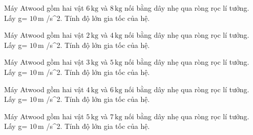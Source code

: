 \begin{bt}
Máy Atwood gồm hai vật $6\,\text{kg}$ và $8\,\text{kg}$ nối bằng dây nhẹ qua ròng rọc lí tưởng. Lấy g= $10\,\text{m}$ /s^2. Tính độ lớn gia tốc của hệ.
\end{bt}

\begin{bt}
Máy Atwood gồm hai vật $2\,\text{kg}$ và $4\,\text{kg}$ nối bằng dây nhẹ qua ròng rọc lí tưởng. Lấy g= $10\,\text{m}$ /s^2. Tính độ lớn gia tốc của hệ.
\end{bt}

\begin{bt}
Máy Atwood gồm hai vật $3\,\text{kg}$ và $5\,\text{kg}$ nối bằng dây nhẹ qua ròng rọc lí tưởng. Lấy g= $10\,\text{m}$ /s^2. Tính độ lớn gia tốc của hệ.
\end{bt}

\begin{bt}
Máy Atwood gồm hai vật $4\,\text{kg}$ và $6\,\text{kg}$ nối bằng dây nhẹ qua ròng rọc lí tưởng. Lấy g= $10\,\text{m}$ /s^2. Tính độ lớn gia tốc của hệ.
\end{bt}

\begin{bt}
Máy Atwood gồm hai vật $5\,\text{kg}$ và $7\,\text{kg}$ nối bằng dây nhẹ qua ròng rọc lí tưởng. Lấy g= $10\,\text{m}$ /s^2. Tính độ lớn gia tốc của hệ.
\end{bt}

